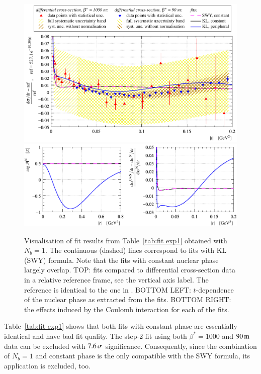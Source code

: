 \begin{figure}
\begin{center}
\includegraphics{fig/fit_exp1/t_dist_rel_with_fit.pdf}
\includegraphics{fig/fit_exp1/phase_cni_effect.pdf}
\caption{Visualisation of fit results from Table~\ref{tab:fit exp1} obtained with $N_b=1$. The continuous (dashed) lines correspond to fits with KL (SWY) formula. Note that the fits with constant nuclear phase largely overlap.
TOP: fits compared to differential cross-section data in a relative reference frame, see the vertical axis label. The reference is identical to the one in \cite{8tev-90m}. 
BOTTOM LEFT: $t$-dependence of the nuclear phase as extracted from the fits.
BOTTOM RIGHT: the effects induced by the Coulomb interaction for each of the fits.
}%
\label{fig:fit exp1}
\end{center}
\end{figure}

Table~\ref{tab:fit exp1} shows that both fits with constant phase are essentially identical and have bad fit quality. The step-2 fit using both $\beta^*=1000$ and $90\,{\rm m}$ data can be excluded with $7.6\,{\rm \sigma}$ significance. Consequently, since the combination of $N_b=1$ and constant phase is the only compatible with the SWY formula, its application is excluded, too.


